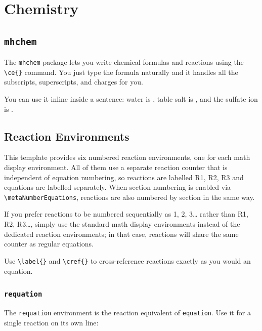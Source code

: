 \section{Chemistry}

	\subsection{\texttt{mhchem}}
	The \texttt{mhchem} package lets you write chemical formulas and reactions using the \texttt{\textbackslash ce\{\}} command. You just type the formula naturally and it handles all the subscripts, superscripts, and charges for you.
	
	You can use it inline inside a sentence: water is , table salt is , and the sulfate ion is .
	
	\subsection{Reaction Environments}
	This template provides six numbered reaction environments, one for each math display environment. All of them use a separate reaction counter that is independent of equation numbering, so reactions are labelled R1, R2, R3 and equations are labelled separately. When section numbering is enabled via \texttt{\textbackslash metaNumberEquations}, reactions are also numbered by section in the same way.
	
	If you prefer reactions to be numbered sequentially as 1, 2, 3… rather than R1, R2, R3…, simply use the standard math display environments instead of the dedicated reaction environments; in that case, reactions will share the same counter as regular equations.
	
	Use \texttt{\textbackslash label\{\}} and \texttt{\textbackslash cref\{\}} to cross-reference reactions exactly as you would an equation.
	
		\subsubsection{\texttt{requation}}
		The \texttt{requation} environment is the reaction equivalent of \texttt{equation}. Use it for a single reaction on its own line:
		
